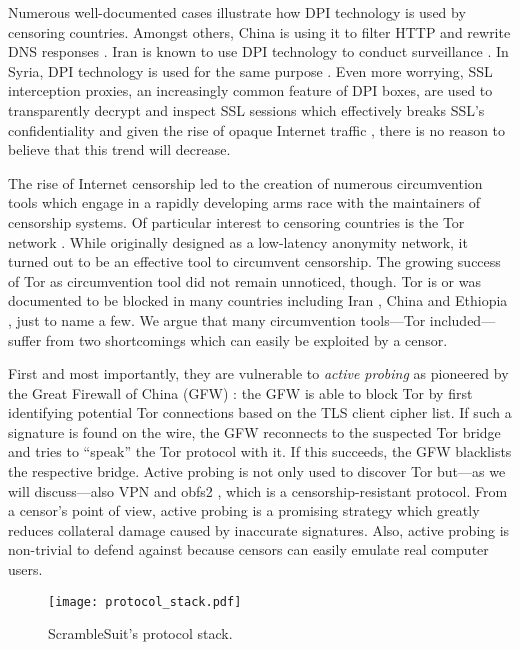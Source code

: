 \documentclass{sig-alternate}
\newcommand{\pt}{\textsf{ScrambleSuit}}
\numberwithin{enumi}{section}
\numberwithin{notesctr}{section}
\begin{document}
Numerous well-documented cases illustrate how DPI technology is used by censoring countries. Amongst
others, China is using it to filter HTTP \cite{Clayton2006} and rewrite DNS responses
\cite{Anonymous2012}. Iran is known to use DPI technology to conduct surveillance \cite{irandpi}. In
Syria, DPI technology is used for the same purpose \cite{effdpi}. Even more worrying, SSL
interception proxies, an increasingly common feature of DPI boxes, are used to transparently decrypt
and inspect SSL sessions which effectively breaks SSL's confidentiality and given the rise of opaque
Internet traffic \cite{White2013}, there is no reason to believe that this trend will decrease.

The rise of Internet censorship led to the creation of numerous circumvention tools which engage in
a rapidly developing arms race with the maintainers of censorship systems. Of particular interest to
censoring countries is the Tor network \cite{Dingledine2004}. While originally designed as a
low-latency anonymity network, it turned out to be an effective tool to circumvent censorship. The
growing success of Tor as circumvention tool did not remain unnoticed, though. Tor is or was
documented to be blocked in many countries including Iran \cite{Iran}, China \cite{Winter2012} and
Ethiopia \cite{Ethiopia}, just to name a few. We argue that many circumvention tools---Tor
included---suffer from two shortcomings which can easily be exploited by a censor.

First and most importantly, they are vulnerable to \emph{active probing} as pioneered by the Great
Firewall of China (GFW) \cite{Winter2012}: the GFW is able to block Tor by first identifying
potential Tor connections based on the TLS client cipher list. If such a signature is found on the
wire, the GFW reconnects to the suspected Tor bridge and tries to ``speak'' the Tor protocol with
it. If this succeeds, the GFW blacklists the respective bridge. Active probing is not only used to
discover Tor but---as we will discuss---also VPN \cite{gfwvpn} and obfs2 \cite{obfs2probe}, which is
a censorship-resistant protocol. From a censor's point of view, active probing is a promising
strategy which greatly reduces collateral damage caused by inaccurate signatures. Also, active
probing is non-trivial to defend against because censors can easily emulate real computer users.

\begin{wrapfigure}{r}{0.15\textwidth}
	\vspace{-20pt}
	\begin{center}
		\texttt{[image: protocol\_stack.pdf]}
	\end{center}
	\caption{\pt{}'s protocol stack.}
	\label{fig:protocol_stack}
	\vspace{-10pt}
\end{wrapfigure}
\end{document}
